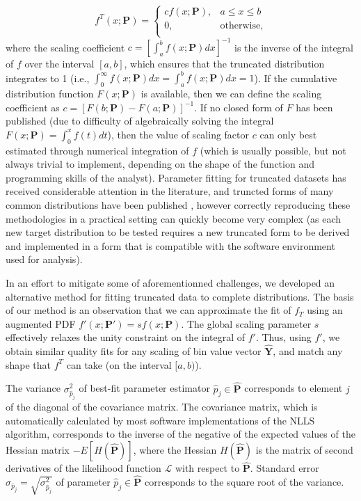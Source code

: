 \documentclass{article}
\begin{document}
\begin{equation}
    f^T(x; \bm{P}) = 
    \begin{cases}
     c f(x; \bm{P}), & a \leq x \leq b\\
      0, & \text{otherwise},\\
    \end{cases}
\end{equation}
where the scaling coefficient $c = \left[ \int_a^b f(x; \bm{P}) dx \right]^{-1}$ is the inverse of the integral of $f$ over the interval $[a, b]$, which ensures that the truncated distribution integrates to 1 (i.e.,  $\int_0^\infty f(x; \bm{P}) dx =  \int_a^b f(x; \bm{P}) dx =  1$). 
If the cumulative distribution function $F(x; \bm{P})$ is available, then we can define the scaling coefficient as $c = \left[ F(b; \bm{P}) - F(a; \bm{P}) \right]^{-1}$.
If no closed form of $F$ has been published (due to difficulty of algebraically solving the integral $F(x; \bm{P}) = \int_0^x f(t) dt$), then the value of scaling factor $c$ can only best estimated through numerical integration of $f$ (which is usually possible, but not always trivial to implement, depending on the shape of the function and programming skills of the analyst).
Parameter fitting for truncated datasets has received considerable attention in the literature, and truncted forms of many common distributions have been published \citep{mittal1989estimating, hannon1999estimation, hegde1989estimation, ahmad2001moments}, however correctly reproducing these methodologies in a practical setting can quickly become very complex (as each new target distribution to be tested requires a new truncated form to be derived and implemented in a form that is compatible with the software environment used for analysis).

In an effort to mitigate some of aforementionned challenges, we developed an alternative method for fitting truncated data to complete distributions.
The basis of our method is an observation that we can approximate the fit of $f_T$ using an augmented PDF $f'(x; \bm{P'}) = sf(x; \bm{P})$.
The global scaling parameter $s$ effectively relaxes the unity constraint on the integral of $f'$.
Thus, using $f'$, we obtain similar quality fits for any scaling of bin value vector $\bm{\hat{Y}}$, and match any shape that $f^T$ can take (on the interval $[a, b)$).

The variance $\sigma^2_{\hat{p}_j}$ of best-fit parameter estimator $\hat{p}_j \in \bm{\hat{P}}$ corresponds to element $j$ of the diagonal of the covariance matrix.
The covariance matrix, which is automatically calculated by most software implementations of the NLLS algorithm, corresponds to the inverse of the  negative of the expected values of the Hessian matrix $-E[H(\bm{\hat{P}})]$, where the Hessian $H(\bm{\hat{P}})$ is the matrix of second derivatives of the likelihood function $\mathcal{L}$ with respect to $\bm{\hat{P}}$.
Standard error $\sigma_{\hat{p}_j} = \sqrt{\sigma^2_{\hat{p}_j}}$ of parameter $\hat{p}_{j} \in \bm{\hat{P}}$ corresponds to the square root of the variance.
\end{document}

